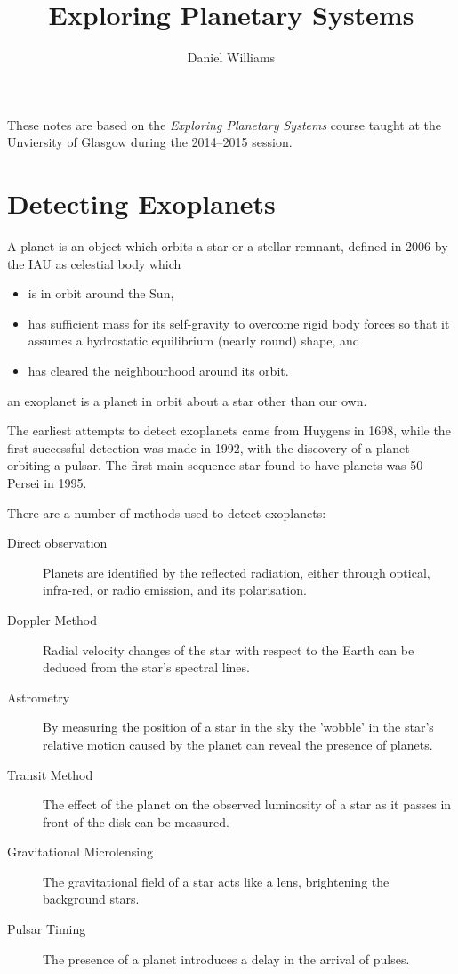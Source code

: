 \documentclass{momento}
\title{Exploring Planetary Systems}
\author{Daniel Williams}
\begin{document}
\maketitle

\tableofcontents

These notes are based on the \textit{Exploring Planetary Systems}
course taught at the Unviersity of Glasgow during the 2014--2015
session.

\chapter{Detecting Exoplanets}
\label{cha:detecting-exoplanets}

A planet is an object which orbits a star or a stellar remnant,
defined in 2006 by the IAU as celestial body which
\begin{itemize}
\item is in orbit around the Sun,
\item has sufficient mass for its self-gravity to overcome rigid body
  forces so that it assumes a hydrostatic equilibrium (nearly round)
  shape, and
\item has cleared the neighbourhood around its orbit.
\end{itemize}
an exoplanet is a planet in orbit about a star other than our own.

The earliest attempts to detect exoplanets came from Huygens in 1698,
while the first successful detection was made in 1992, with the
discovery of a planet orbiting a pulsar. The first main sequence star
found to have planets was 50 Persei in 1995.

There are a number of methods used to detect exoplanets:

\begin{description}
\item[Direct observation] Planets are identified by the reflected
  radiation, either through optical, infra-red, or radio emission, and
  its polarisation.
\item[Doppler Method] Radial velocity changes of the star with respect
  to the Earth can be deduced from the star's spectral lines.
\item[Astrometry] By measuring the position of a star in the sky the
  'wobble' in the star's relative motion caused by the planet can
  reveal the presence of planets.
\item[Transit Method] The effect of the planet on the observed
  luminosity of a star as it passes in front of the disk can be
  measured.
\item[Gravitational Microlensing] The gravitational field of a star
  acts like a lens, brightening the background stars.
\item[Pulsar Timing] The presence of a planet introduces a delay in
  the arrival of pulses.
\end{description}
\end{document}
